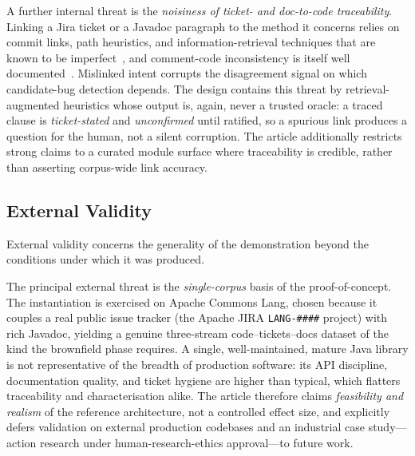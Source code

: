 A further internal threat is the \emph{noisiness of ticket- and doc-to-code traceability}. Linking a Jira ticket or a Javadoc paragraph to the method it concerns relies on commit links, path heuristics, and information-retrieval techniques that are known to be imperfect~\cite{antoniol2002recovering,borg2014recovering,lin2021tbert}, and comment-code inconsistency is itself well documented~\cite{tan2012tcomment,wen2019codecomment}. Mislinked intent corrupts the disagreement signal on which candidate-bug detection depends. The design contains this threat by retrieval-augmented heuristics whose output is, again, never a trusted oracle: a traced clause is \emph{ticket-stated} and \emph{unconfirmed} until ratified, so a spurious link produces a question for the human, not a silent corruption. The article additionally restricts strong claims to a curated module surface where traceability is credible, rather than asserting corpus-wide link accuracy.

\subsection{External Validity}
\label{subsec:threats-external}

External validity concerns the generality of the demonstration beyond the conditions under which it was produced.

The principal external threat is the \emph{single-corpus} basis of the proof-of-concept. The instantiation is exercised on Apache Commons Lang, chosen because it couples a real public issue tracker (the Apache JIRA \texttt{LANG-\#\#\#\#} project) with rich Javadoc, yielding a genuine three-stream code--tickets--docs dataset of the kind the brownfield phase requires. A single, well-maintained, mature Java library is not representative of the breadth of production software: its API discipline, documentation quality, and ticket hygiene are higher than typical, which flatters traceability and characterisation alike. The article therefore claims \emph{feasibility and realism} of the reference architecture, not a controlled effect size, and explicitly defers validation on external production codebases and an industrial case study---action research under human-research-ethics approval---to future work.

